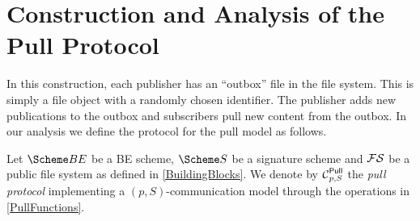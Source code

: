\section{Construction and Analysis of the Pull Protocol}
\label{PullAnalysis}

In this construction, each publisher has an \enquote{outbox} file in the file 
system.
This is simply a file object with a randomly chosen identifier.
The publisher adds new publications to the outbox and subscribers pull new 
content from the outbox.
In our analysis we define the protocol for the pull model as follows.

\begin{definition}\label{PullModel}
  Let \(\BE\) be a \ac{BE} scheme, \(\S\) be a signature scheme and \(\FS\) be 
  a public file system as defined in \cref{BuildingBlocks}.
  We denote by \(\Pull[p, S]\) the \emph{pull protocol} implementing a \((p, 
    S)\)-communication model through the operations in \cref{PullFunctions}.
\end{definition}

